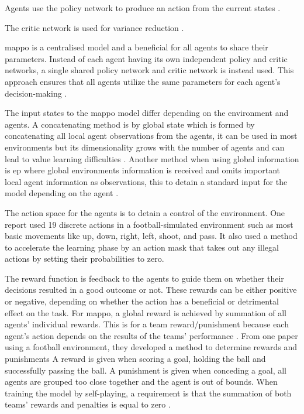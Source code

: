 Agents use the policy network to produce an action from the current states \cite{yu_surprising_2022}. 

The critic network is used for variance reduction \cite{yu_surprising_2022}. 

\ac{mappo} is a centralised model and a beneficial for all agents to share their parameters.
Instead of each agent having its own independent policy and critic networks, a single shared policy network and critic network is instead used. This approach ensures that all agents utilize the same parameters for each agent's decision-making \cite{yu_surprising_2022}.

The input states to the \ac{mappo} model differ depending on the environment and agents.
A concatenating method is by global state which is formed by concatenating all local agent observations from the agents, it can be used in most environments but its dimensionality grows with the number of agents and can lead to value learning difficulties \cite{yu_surprising_2022}. Another method when using global information is \ac{ep} where global environments information is received and omits important local agent information as observations, this to detain a standard input for the model depending on the agent \cite{yu_surprising_2022}.

The action space for the agents is to detain a control of the environment. One report used 19 discrete actions in a football-simulated environment such as most basic movements like up, down, right, left, shoot, and pass. It also used a method to accelerate the learning phase by an action mask that takes out any illegal actions by setting their probabilities to zero\cite{lin_tizero_2023}.

The reward function is feedback to the agents to guide them on whether their decisions resulted in a good outcome or not. These rewards can be either positive or negative, depending on whether the action has a beneficial or detrimental effect on the task. 
For \ac{mappo}, a global reward is achieved by summation of all agents' individual rewards. This is for a team reward/punishment because each agent's action depends on the results of the teams' performance \cite{yu_surprising_2022}. From one paper using a football environment, they developed a method to determine rewards and punishments\cite{lin_tizero_2023} A reward is given when scoring a goal, holding the ball and successfully passing the ball. A punishment is given when conceding a goal, all agents are grouped too close together and the agent is out of bounds. When training the model by self-playing, a requirement is that the summation of both teams' rewards and penalties is equal to zero \cite{lin_tizero_2023}.

